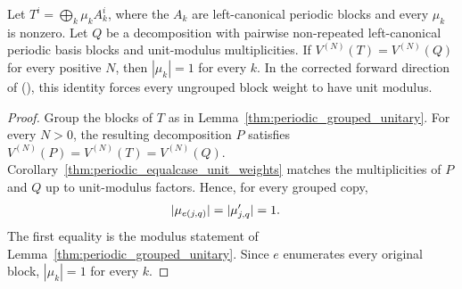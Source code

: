 \begin{lemma}
    \label{thm:periodic_ungrouped_weight_moduli}
    \leanok
    Let $T^i=\bigoplus_k\mu_k A_k^i$, where the $A_k$ are left-canonical
    periodic blocks and every $\mu_k$ is nonzero. Let $Q$ be a decomposition
    with pairwise non-repeated left-canonical periodic basis blocks and
    unit-modulus multiplicities. If $V^{(N)}(T)=V^{(N)}(Q)$ for every positive $N$,
    then $|\mu_k|=1$ for every $k$.
    In the corrected forward direction of
    \cite[Theorem~4.1]{DeLasCuevas2017Irreducible}
    (\cite{gap:dccsp17_thm41_forward_trace_preservation}), this identity
    forces every ungrouped block weight to have unit modulus.
\end{lemma}

\begin{proof}
    \leanok
    Group the blocks of $T$ as in Lemma~\ref{thm:periodic_grouped_unitary}.
    For every $N>0$, the resulting decomposition $P$ satisfies
    $V^{(N)}(P)=V^{(N)}(T)=V^{(N)}(Q)$.
    Corollary~\ref{thm:periodic_equalcase_unit_weights} matches the
    multiplicities of $P$ and $Q$ up to unit-modulus factors. Hence, for every
    grouped copy,
    \begin{align}
        |\mu_{e(j,q)}| & =|\mu'_{j,q}|=1. \notag
    \end{align}
    The first equality is the modulus statement of
    Lemma~\ref{thm:periodic_grouped_unitary}. Since $e$ enumerates every
    original block, $|\mu_k|=1$ for every $k$.
\end{proof}
